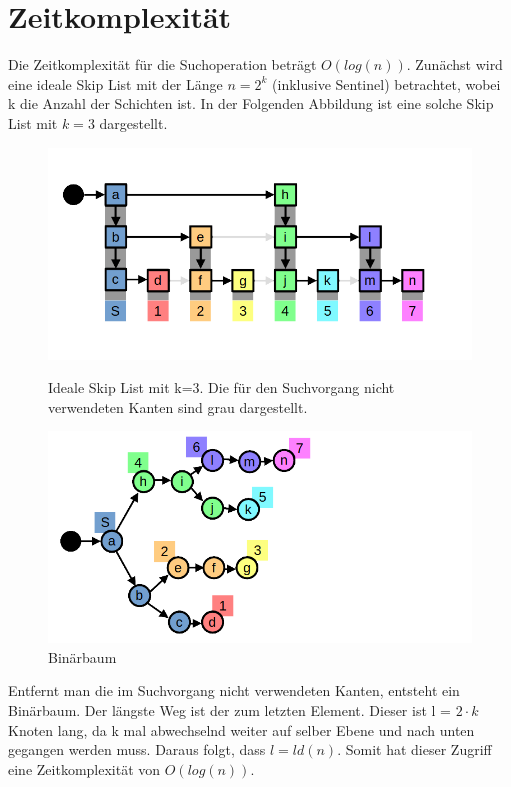 \documentclass{TUBAFarbeiten}
\begin{document}
\section{Zeitkomplexität}

Die Zeitkomplexität für die Suchoperation beträgt \(O(log(n))\).
Zunächst wird eine ideale Skip List mit der Länge \(n = 2 ^ k\) (inklusive Sentinel) betrachtet, wobei k die Anzahl der Schichten ist. In der Folgenden Abbildung ist eine solche Skip List mit \(k = 3\) dargestellt. 
\begin{figure}
\includegraphics[scale=0.4]{img/ideal}
\caption{Ideale Skip List mit k=3. Die für den Suchvorgang nicht verwendeten Kanten sind grau dargestellt.}
\label{fig:Img3}
\includegraphics[scale=0.4]{img/ideal_baum}
\caption{Binärbaum}
\label{fig:Img4}
\end{figure}
Entfernt man die im Suchvorgang nicht verwendeten Kanten, entsteht ein Binärbaum. Der längste Weg ist der zum letzten Element. Dieser ist l = \(2 \cdot k\) Knoten lang, da k mal abwechselnd weiter auf selber Ebene und nach unten gegangen werden muss. Daraus folgt, dass \(l = ld(n)\). Somit hat dieser Zugriff eine Zeitkomplexität von \(O(log(n))\). 
\end{document}
